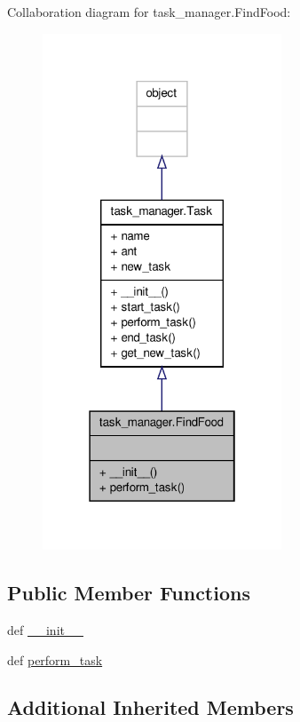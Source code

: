 Collaboration diagram for task\+\_\+manager.\+Find\+Food\+:
\nopagebreak
\begin{figure}[H]
\begin{center}
\leavevmode
\includegraphics[width=202pt]{classtask__manager_1_1FindFood__coll__graph}
\end{center}
\end{figure}
\subsection*{Public Member Functions}
\begin{DoxyCompactItemize}
\item 
def \hyperlink{classtask__manager_1_1FindFood_abf53da166a9a36fbab4ce1c87fa93694}{\+\_\+\+\_\+init\+\_\+\+\_\+}
\item 
def \hyperlink{classtask__manager_1_1FindFood_aab9303f02e5e7d4884228e1fe5f6142c}{perform\+\_\+task}
\end{DoxyCompactItemize}
\subsection*{Additional Inherited Members}



